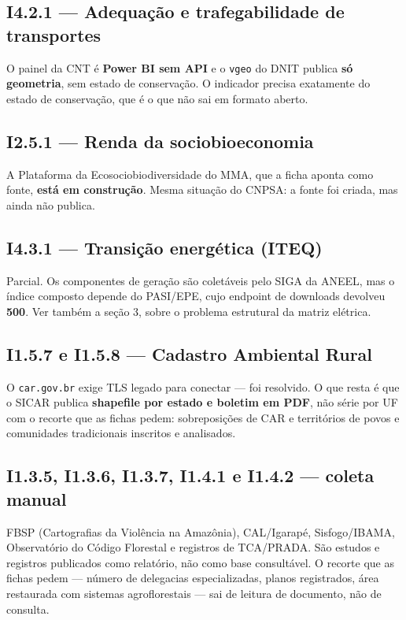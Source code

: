 \documentclass[11pt,a4paper]{article}
\begin{document}
\subsection*{I4.2.1 --- Adequação e trafegabilidade de transportes}

O painel da CNT é \textbf{Power BI sem API} e o \texttt{vgeo} do DNIT publica
\textbf{só geometria}, sem estado de conservação. O indicador precisa exatamente do
estado de conservação, que é o que não sai em formato aberto.

\subsection*{I2.5.1 --- Renda da sociobioeconomia}

A Plataforma da Ecosociobiodiversidade do MMA, que a ficha aponta como fonte,
\textbf{está em construção}. Mesma situação do CNPSA: a fonte foi criada, mas ainda não
publica.

\subsection*{I4.3.1 --- Transição energética (ITEQ)}

Parcial. Os componentes de geração são coletáveis pelo SIGA da ANEEL, mas o índice
composto depende do PASI/EPE, cujo endpoint de downloads devolveu \textbf{500}. Ver
também a seção 3, sobre o problema estrutural da matriz elétrica.

\subsection*{I1.5.7 e I1.5.8 --- Cadastro Ambiental Rural}

O \texttt{car.gov.br} exige TLS legado para conectar --- foi resolvido. O que resta é
que o SICAR publica \textbf{shapefile por estado e boletim em PDF}, não série por UF
com o recorte que as fichas pedem: sobreposições de CAR e territórios de povos e
comunidades tradicionais inscritos e analisados.

\subsection*{I1.3.5, I1.3.6, I1.3.7, I1.4.1 e I1.4.2 --- coleta manual}

FBSP (Cartografias da Violência na Amazônia), CAL/Igarapé, Sisfogo/IBAMA, Observatório
do Código Florestal e registros de TCA/PRADA. São estudos e registros publicados como
relatório, não como base consultável. O recorte que as fichas pedem --- número de
delegacias especializadas, planos registrados, área restaurada com sistemas
agroflorestais --- sai de leitura de documento, não de consulta.
\end{document}

